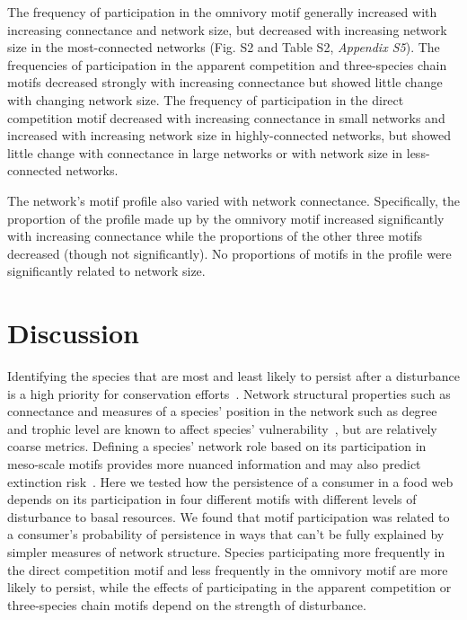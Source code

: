 \documentclass[12pt]{article}
\begin{document}
\begin{spacing}{2.0}
        
        The frequency of participation in the omnivory motif generally increased with increasing connectance and network size, but decreased with increasing network size in the most-connected networks (Fig. S2 and Table S2, \emph{Appendix S5}).
        The frequencies of participation in the apparent competition and three-species chain motifs decreased strongly with increasing connectance but showed little change with changing network size.
        The frequency of participation in the direct competition motif decreased with increasing connectance in small networks and increased with increasing network size in highly-connected networks, but showed little change with connectance in large networks or with network size in less-connected networks.

        
        The network's motif profile also varied with network connectance.
        Specifically, the proportion of the profile made up by the omnivory motif increased significantly  with increasing connectance while the proportions of the other three motifs decreased (though not significantly).
        No proportions of motifs in the profile were significantly related to network size.


\section*{Discussion}

    Identifying the species that are most and least likely to persist after a disturbance is a high priority for conservation efforts~\citep{Bottrilletal2008}. 
    Network structural properties such as connectance and measures of a species' position in the network such as degree and trophic level are known to affect species' vulnerability~\citep{Dunne2002, Eklof2006, PascualDunne2006,prill2005dynamic, bascompte2005simple,curtsdotter2011robustness, dunne2009cascading}, but are relatively coarse metrics.
    Defining a species' network role based on its participation in meso-scale motifs provides more nuanced information and may also predict extinction risk~\citep{Stouffer2007,Stouffer2010b,Simmons2019}.
    Here we tested how the persistence of a consumer in a food web depends on its participation in four different motifs with different levels of disturbance to basal resources.  
    We found that motif participation was related to a consumer's probability of persistence in ways that can't be fully explained by simpler measures of network structure. 
    Species participating more frequently in the direct competition motif and less frequently in the omnivory motif are more likely to persist, while the effects of participating in the apparent competition or three-species chain motifs depend on the strength of disturbance.



\end{spacing}
\end{document}
